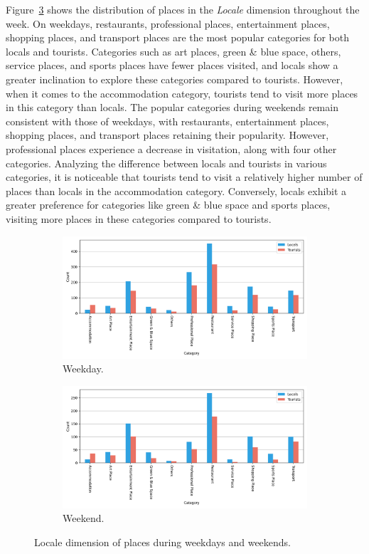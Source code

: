 \documentclass{article}
\theoremstyle{definition}
\theoremstyle{remark}
\begin{document}
Figure~\ref{fig:places_locale_week} shows the distribution of places in the \textit{Locale} dimension throughout the week. On weekdays, restaurants, professional places, entertainment places, shopping places, and transport places are the most popular categories for both locals and tourists. Categories such as art places, green \& blue space, others, service places, and sports places have fewer places visited, and locals show a greater inclination to explore these categories compared to tourists. However, when it comes to the accommodation category, tourists tend to visit more places in this category than locals. The popular categories during weekends remain consistent with those of weekdays, with restaurants, entertainment places, shopping places, and transport places retaining their popularity. However, professional places experience a decrease in visitation, along with four other categories. Analyzing the difference between locals and tourists in various categories, it is noticeable that tourists tend to visit a relatively higher number of places than locals in the accommodation category. Conversely, locals exhibit a greater preference for categories like green \& blue space and sports places, visiting more places in these categories compared to tourists.


\begin{figure}[!h]

\centering
\begin{subfigure}{0.6\textheight}
\centering
\includegraphics[width=0.9\linewidth]{figures/places_locale_weekday.png}
\caption{Weekday.}
\label{fig:places_locale_weekday}
\end{subfigure}
\begin{subfigure}{0.6\textheight}
\centering
\includegraphics[width=0.9\linewidth]{figures/places_locale_weekend.png}
\caption{Weekend.}
\label{fig:places_locale_weekend}
\end{subfigure}

\caption{Locale dimension of places during weekdays and weekends.}
\label{fig:places_locale_week}
\end{figure}
\end{document}
